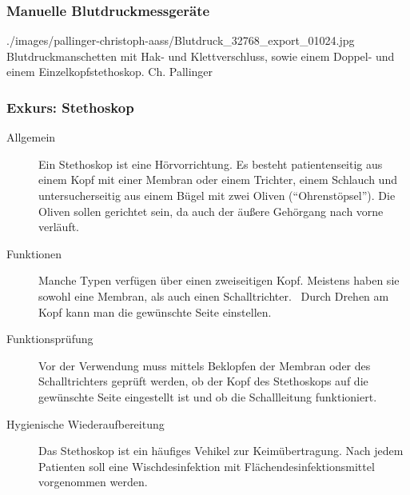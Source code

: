 \subsubsection{Manuelle Blutdruckmessgeräte}
{}
{}
{}
{}

{}
{}
{./images/pallinger-christoph-aass/Blutdruck_32768_export_01024.jpg}
{Blutdruckmanschetten mit Hak- und Klettverschluss, sowie
einem Doppel- und einem Einzelkopfstethoskop.}
{Ch. Pallinger}

\subsubsection{Exkurs: Stethoskop}
\label{topic:stethoskop}

{
\begin{description}
  \item[Allgemein] Ein Stethoskop ist eine Hörvorrichtung. Es besteht
patientenseitig aus einem Kopf mit einer Membran oder einem
Trichter, einem Schlauch und untersucherseitig aus einem
Bügel mit zwei Oliven (\enquote{Ohrenstöpsel}).
Die Oliven sollen  gerichtet sein, da auch der
äußere Gehörgang nach vorne verläuft.
\item[Funktionen] Manche Typen verfügen über einen
zweiseitigen Kopf.
Meistens haben sie sowohl eine Membran, als auch einen
Schalltrichter.~ Durch Drehen am Kopf kann man die gewünschte Seite
einstellen.
\item[Funktionsprüfung] Vor der Verwendung muss mittels Beklopfen der Membran oder
des Schalltrichters geprüft werden, ob der Kopf des
Stethoskops auf die gewünschte Seite eingestellt ist und ob
die Schallleitung funktioniert.
\item[Hygienische Wiederaufbereitung] Das Stethoskop ist ein
häufiges Vehikel zur Keimübertragung. Nach jedem Patienten soll eine 
Wischdesinfektion mit Flächendesinfektionsmittel
vorgenommen werden.
\end{description}

}{}{}{}{}



